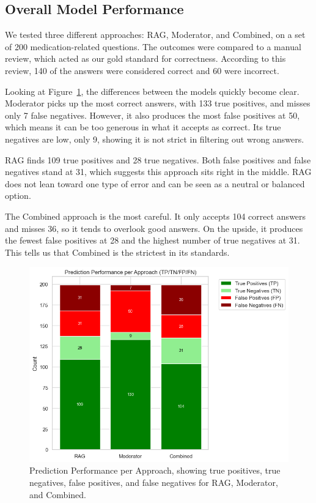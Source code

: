 \subsection{Overall Model Performance}

We tested three different approaches: RAG, Moderator, and Combined, on a set of 200 medication-related questions. The outcomes were compared to a manual review, which acted as our gold standard for correctness. According to this review, 140 of the answers were considered correct and 60 were incorrect.

Looking at Figure~\ref{fig:prediction_performance_bar}, the differences between the models quickly become clear. Moderator picks up the most correct answers, with 133 true positives, and misses only 7 false negatives. However, it also produces the most false positives at 50, which means it can be too generous in what it accepts as correct. Its true negatives are low, only 9, showing it is not strict in filtering out wrong answers.

RAG finds 109 true positives and 28 true negatives. Both false positives and false negatives stand at 31, which suggests this approach sits right in the middle. RAG does not lean toward one type of error and can be seen as a neutral or balanced option.

The Combined approach is the most careful. It only accepts 104 correct answers and misses 36, so it tends to overlook good answers. On the upside, it produces the fewest false positives at 28 and the highest number of true negatives at 31. This tells us that Combined is the strictest in its standards.

\begin{figure}[ht]
  \centering
  \includegraphics[width=0.95\linewidth]{figures/prediction_performance_per_approach.png}
  \caption{Prediction Performance per Approach, showing true positives, true negatives, false positives, and false negatives for RAG, Moderator, and Combined.}
  \label{fig:prediction_performance_bar}
\end{figure}

